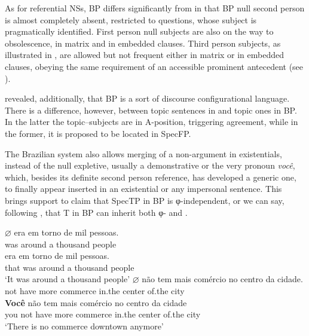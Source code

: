 \documentclass[output=paper]{langsci/langscibook}
\begin{document}
As for referential NSs, \gls{BP} differs significantly
from  in that \gls{BP} null second person is
almost completely absent, restricted to questions, whose subject is
pragmatically identified. First person null subjects are also on the way to
obsolescence, in matrix and in embedded clauses. Third person subjects, as
illustrated in , are allowed but not frequent either in
matrix or in embedded clauses, obeying the same requirement of an accessible
prominent antecedent (see \citealt{KatoDuarte2014a,KatoDuarte2014b}).

 revealed, additionally, that \gls{BP} is a sort of discourse configurational language. There is a
difference, however, between topic sentences in  and topic ones in
\gls{BP}. In the latter the topic--subjects are in
A-position, triggering agreement, while in the former, it is proposed to be
located in SpecFP.

The Brazilian system also allows merging of a non-argument in existentials,
instead of the null expletive, usually a demonstrative or the very pronoun
\emph{você}, which, besides its definite second person reference, has developed
a generic one, to finally appear inserted in an existential or any impersonal
sentence. This brings support to  claim that SpecTP
in \gls{BP} is φ-in\-de\-pen\-dent, or we can say,
following \citet{Miyagawa2010}, that T in \gls{BP} can
inherit both φ- and .

\ea%
    \label{ex:26.40bp}
    \ea
    \gll	\textbf{$\varnothing$\tss{\Expl}} era {em torno de}  mil pessoas.\\
			{} was  around {a thousand} people\\
    \ex
     era  {em torno de} mil pessoas.\\
			that was around {a thousand} people\\
	\glt	\enquote*{It was around a thousand people}
    \z
\ex%
    \label{ex:26.41}
    \ea
	\gll	\textbf{$\varnothing$\tss{\Expl}} não tem mais  comércio   no centro da      cidade.\\
			{} not have more commerce in.the center of.the city\\
    \ex
	\gll	\textbf{Você} não tem   mais comércio   no      centro da      cidade\\
			you   not have more commerce in.the center of.the city\\
	\glt	\enquote*{There is no commerce downtown anymore}
    \z
\z
\end{document}
